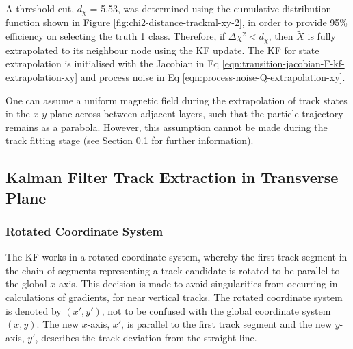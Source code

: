 A threshold cut, $d_{\chi}$ = 5.53, was determined using the cumulative distribution function shown in Figure \ref{fig:chi2-distance-trackml-xy-2}, in order to provide 95\% efficiency on selecting the truth 1 class. Therefore, if $\Delta \chi^{2} < d_{\chi}$, then $\tilde{X}$ is fully extrapolated to its neighbour node using the KF update. The KF for state extrapolation is initialised with the Jacobian in Eq \eqref{eqn:transition-jacobian-F-kf-extrapolation-xy} and process noise in Eq \eqref{eqn:process-noise-Q-extrapolation-xy}.

One can assume a uniform magnetic field during the extrapolation of track states in the $x$-$y$ plane across between adjacent layers, such that the particle trajectory remains as a parabola. However, this assumption cannot be made during the track fitting stage (see Section \ref{chapter-6-derivation-part-2} for further information). 








\clearpage
\subsection{Kalman Filter Track Extraction in Transverse Plane}
\label{chapter-6-derivation-part-2}

\subsubsection{Rotated Coordinate System}

The KF works in a rotated coordinate system, whereby the first track segment in the chain of segments representing a track candidate is rotated to be parallel to the global $x$-axis. This decision is made to avoid singularities from occurring in calculations of gradients, for near vertical tracks. The rotated coordinate system is denoted by $(x', y')$, not to be confused with the global coordinate system $(x, y)$. The new $x$-axis, $x'$, is parallel to the first track segment and the new $y$-axis, $y'$, describes the track deviation from the straight line.

